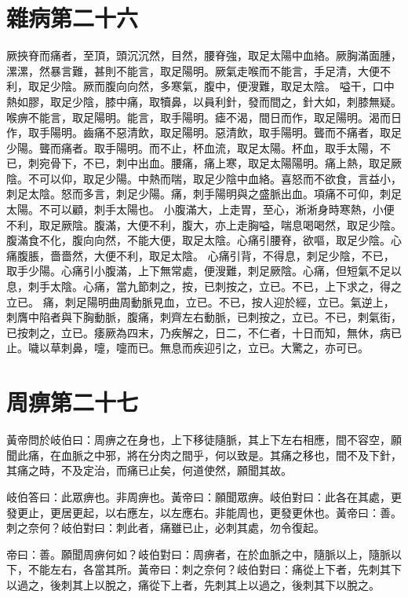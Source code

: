 \section{雜病第二十六}

厥挾脊而痛者，至頂，頭沉沉然，目然，腰脊強，取足太陽中血絡。厥胸滿面腫，漯漯，然暴言難，甚則不能言，取足陽明。厥氣走喉而不能言，手足清，大便不利，取足少陰。厥而腹向向然，多寒氣，腹中，便溲難，取足太陰。
嗌干，口中熱如膠，取足少陰，膝中痛，取犢鼻，以員利針，發而間之，針大如，刺膝無疑。喉痹不能言，取足陽明。能言，取手陽明。瘧不渴，間日而作，取足陽明。渴而日作，取手陽明。齒痛不惡清飲，取足陽明。惡清飲，取手陽明。聾而不痛者，取足少陽。聾而痛者。取手陽明。而不止，杯血流，取足太陽。杯血，取手太陽，不已，刺宛骨下，不已，刺中出血。腰痛，痛上寒，取足太陽陽明。痛上熱，取足厥陰。不可以仰，取足少陽。中熱而喘，取足少陰中血絡。喜怒而不欲食，言益小，刺足太陰。怒而多言，刺足少陽。痛，刺手陽明與之盛脈出血。項痛不可仰，刺足太陽。不可以顧，刺手太陽也。
小腹滿大，上走胃，至心，淅淅身時寒熱，小便不利，取足厥陰。腹滿，大便不利，腹大，亦上走胸嗌，喘息喝喝然，取足少陰。腹滿食不化，腹向向然，不能大便，取足太陰。心痛引腰脊，欲嘔，取足少陰。心痛腹脹，嗇嗇然，大便不利，取足太陰。
心痛引背，不得息，刺足少陰，不已，取手少陽。心痛引小腹滿，上下無常處，便溲難，刺足厥陰。心痛，但短氣不足以息，刺手太陰。心痛，當九節刺之，按，已刺按之，立已。不已，上下求之，得之立已。
痛，刺足陽明曲周動脈見血，立已。不已，按人迎於經，立已。氣逆上，刺膺中陷者與下胸動脈，腹痛，刺齊左右動脈，已刺按之，立已。不已，刺氣街，已按刺之，立已。痿厥為四末，乃疾解之，日二，不仁者，十日而知，無休，病已止。噦以草刺鼻，嚏，嚏而已。無息而疾迎引之，立已。大驚之，亦可已。



\section{周痹第二十七}

黃帝問於岐伯曰：周痹之在身也，上下移徒隨脈，其上下左右相應，間不容空，願聞此痛，在血脈之中邪，將在分肉之間乎，何以致是。其痛之移也，間不及下針，其痛之時，不及定治，而痛已止矣，何道使然，願聞其故。

岐伯答曰：此眾痹也。非周痹也。黃帝曰：願聞眾痹。岐伯對曰：此各在其處，更發更止，更居更起，以右應左，以左應右。非能周也，更發更休也。黃帝曰：善。刺之奈何？岐伯對曰：刺此者，痛雖已止，必刺其處，勿令復起。

帝曰：善。願聞周痹何如？岐伯對曰：周痹者，在於血脈之中，隨脈以上，隨脈以下，不能左右，各當其所。黃帝曰：刺之奈何？岐伯對曰：痛從上下者，先刺其下以過之，後刺其上以脫之，痛從下上者，先刺其上以過之，後刺其下以脫之。

